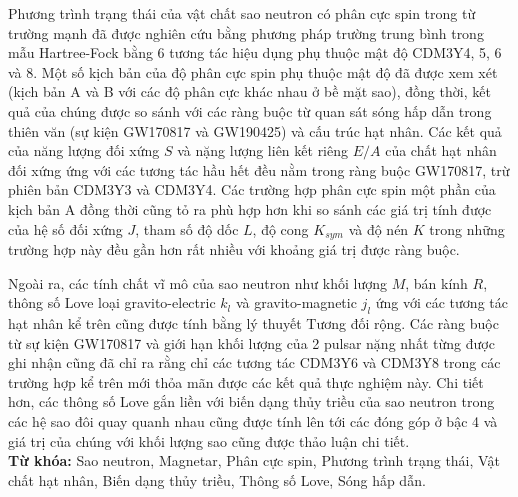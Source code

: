 Phương trình trạng thái của vật chất sao neutron có phân cực spin trong từ trường mạnh đã được nghiên cứu bằng phương pháp trường trung bình trong mẫu Hartree-Fock bằng 6 tương tác hiệu dụng phụ thuộc mật độ CDM3Y4, 5, 6 và 8. Một số kịch bản của độ phân cực spin phụ thuộc mật độ đã được xem xét (kịch bản A và B với các độ phân cực khác nhau ở bề mặt sao), đồng thời, kết quả của chúng được so sánh với các ràng buộc từ quan sát sóng hấp dẫn trong thiên văn (sự kiện GW170817 và GW190425) và cấu trúc hạt nhân. Các kết quả của năng lượng đối xứng $S$ và nặng lượng liên kết riêng $E/A$ của chất hạt nhân đối xứng ứng với các tương tác hầu hết đều nằm trong ràng buộc GW170817, trừ phiên bản CDM3Y3 và CDM3Y4. Các trường hợp phân cực spin một phần của kịch bản A đồng thời cũng tỏ ra phù hợp hơn khi so sánh các giá trị tính được của hệ số đối xứng $J$, tham số độ dốc $L$, độ cong $K_{sym}$ và độ nén $K$ trong những trường hợp này đều gần hơn rất nhiều với khoảng giá trị được ràng buộc.

Ngoài ra, các tính chất vĩ mô của sao neutron như khối lượng $M$, bán kính $R$, thông số Love loại gravito-electric $k_l$ và gravito-magnetic $j_l$ ứng với các tương tác hạt nhân kể trên cũng được tính bằng lý thuyết Tương đối rộng. Các ràng buộc từ sự kiện GW170817 và giới hạn khối lượng của 2 pulsar nặng nhất từng được ghi nhận cũng đã chỉ ra rằng chỉ các tương tác CDM3Y6 và CDM3Y8 trong các trường hợp kể trên mới thỏa mãn được các kết quả thực nghiệm này. Chi tiết hơn, các thông số Love gắn liền với biến dạng thủy triều của sao neutron trong các hệ sao đôi quay quanh nhau cũng được tính lên tới các đóng góp ở bậc 4 và giá trị của chúng với khối lượng sao cũng được thảo luận chi tiết.\\[5mm]
\textbf{Từ khóa:} Sao neutron, Magnetar, Phân cực spin, Phương trình trạng thái, Vật chất hạt nhân, Biến dạng thủy triều, Thông số Love, Sóng hấp dẫn.
